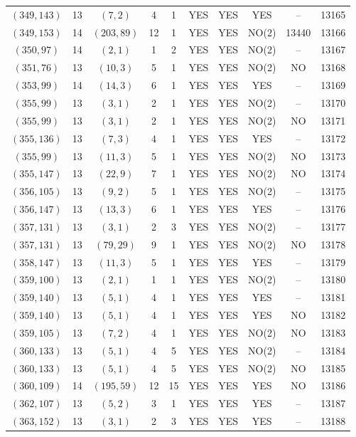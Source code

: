 \begin{longtable}{|c|c|c|c|c|c|c|c|c|c|}
$(349, 143)$ & 13 & $(7, 2)$ & 4 & 1 & YES & YES & YES & -- & 13165\\
$(349, 153)$ & 14 & $(203, 89)$ & 12 & 1 & YES & YES & NO(2) & 13440 & 13166\\
$(350, 97)$ & 14 & $(2, 1)$ & 1 & 2 & YES & YES & NO(2) & -- & 13167\\
$(351, 76)$ & 13 & $(10, 3)$ & 5 & 1 & YES & YES & NO(2) & NO & 13168\\
$(353, 99)$ & 14 & $(14, 3)$ & 6 & 1 & YES & YES & YES & -- & 13169\\
$(355, 99)$ & 13 & $(3, 1)$ & 2 & 1 & YES & YES & NO(2) & -- & 13170\\
$(355, 99)$ & 13 & $(3, 1)$ & 2 & 1 & YES & YES & NO(2) & NO & 13171\\
$(355, 136)$ & 13 & $(7, 3)$ & 4 & 1 & YES & YES & YES & -- & 13172\\
$(355, 99)$ & 13 & $(11, 3)$ & 5 & 1 & YES & YES & NO(2) & NO & 13173\\
$(355, 147)$ & 13 & $(22, 9)$ & 7 & 1 & YES & YES & NO(2) & NO & 13174\\
$(356, 105)$ & 13 & $(9, 2)$ & 5 & 1 & YES & YES & NO(2) & -- & 13175\\
$(356, 147)$ & 13 & $(13, 3)$ & 6 & 1 & YES & YES & YES & -- & 13176\\
$(357, 131)$ & 13 & $(3, 1)$ & 2 & 3 & YES & YES & NO(2) & -- & 13177\\
$(357, 131)$ & 13 & $(79, 29)$ & 9 & 1 & YES & YES & NO(2) & NO & 13178\\
$(358, 147)$ & 13 & $(11, 3)$ & 5 & 1 & YES & YES & YES & -- & 13179\\
$(359, 100)$ & 13 & $(2, 1)$ & 1 & 1 & YES & YES & NO(2) & -- & 13180\\
$(359, 140)$ & 13 & $(5, 1)$ & 4 & 1 & YES & YES & YES & -- & 13181\\
$(359, 140)$ & 13 & $(5, 1)$ & 4 & 1 & YES & YES & YES & NO & 13182\\
$(359, 105)$ & 13 & $(7, 2)$ & 4 & 1 & YES & YES & NO(2) & NO & 13183\\
$(360, 133)$ & 13 & $(5, 1)$ & 4 & 5 & YES & YES & NO(2) & -- & 13184\\
$(360, 133)$ & 13 & $(5, 1)$ & 4 & 5 & YES & YES & NO(2) & NO & 13185\\
$(360, 109)$ & 14 & $(195, 59)$ & 12 & 15 & YES & YES & YES & NO & 13186\\
$(362, 107)$ & 13 & $(5, 2)$ & 3 & 1 & YES & YES & YES & -- & 13187\\
$(363, 152)$ & 13 & $(3, 1)$ & 2 & 3 & YES & YES & YES & -- & 13188\\

\end{longtable}
